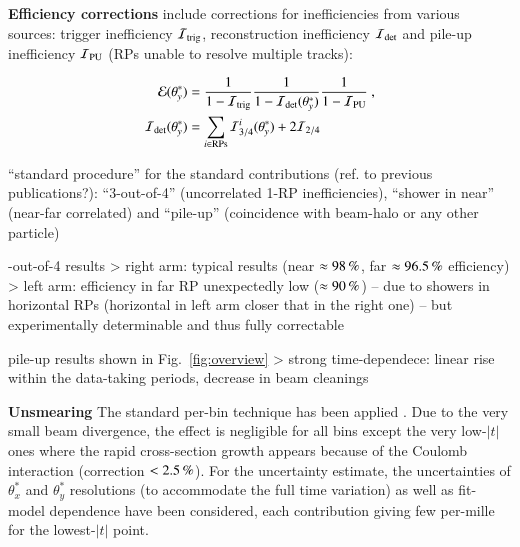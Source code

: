 
{\bf Efficiency corrections} include corrections for inefficiencies from various sources: trigger inefficiency ${\cal I}_{\rm trig}$, reconstruction inefficiency ${\cal I}_{\rm det}$ and pile-up inefficiency ${\cal I}_{\rm PU}$ (RPs unable to resolve multiple tracks):

\begin{equation}
\label{efficiency}
	\begin{aligned}
		{\cal E}(\theta_y^*) &= {1\over 1 - {\cal I}_{\rm trig}} {1\over 1 - {\cal I}_{\rm det}(\theta_y^*)} {1\over 1 - {\cal I}_{\rm PU}}\ ,\\
		{\cal I}_{\rm det}(\theta_y^*) &= \sum\limits_{i\in \rm RPs} {\cal I}^i_{3/4}(\theta_y^*) + 2 {\cal I}_{2/4}\\
	\end{aligned}
\end{equation}

\> ``standard procedure'' for the standard contributions (ref. to previous publications?): ``3-out-of-4'' (uncorrelated 1-RP inefficiencies), ``shower in near'' (near-far correlated) and ``pile-up'' (coincidence with beam-halo or any other particle)

-out-of-4 results
\>> right arm: typical results (near $\approx 98\,{\rm \%}$, far $\approx 96.5\,{\rm \%}$ efficiency)
\>> left arm: efficiency in far RP unexpectedly low ($\approx 90\,{\rm \%}$) -- due to showers in horizontal RPs (horizontal in left arm closer that in the right one) -- but experimentally determinable and thus fully correctable

\> pile-up results shown in Fig.~\ref{fig:overview}
\>> strong time-dependece: linear rise within the data-taking periods, decrease in beam cleanings



{\bf Unsmearing} The standard per-bin technique has been applied \cite{8tev-90m}. Due to the very small beam divergence, the effect is negligible for all bins except the very low-$|t|$ ones where the rapid cross-section growth appears because of the Coulomb interaction (correction $< 2.5\,{\rm \%}$). For the uncertainty estimate, the uncertainties of $\theta_x^*$ and $\theta_y^*$ resolutions (to accommodate the full time variation) as well as fit-model dependence have been considered, each contribution giving few per-mille for the lowest-$|t|$ point.

